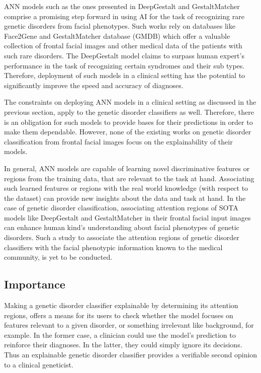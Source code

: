 \documentclass[../report.tex]{subfiles}
\begin{document}
    ANN models such as the ones presented in DeepGestalt \cite{Gurovich2019} and GestaltMatcher \cite{hsieh2022gestaltmatcher} comprise a promising step forward in using AI for the task of recognizing rare genetic disorders from facial phenotypes. Such works rely on databases like Face2Gene \cite{face2gene} and GestaltMatcher database (GMDB) \cite{gmdb}  which offer a valuable collection of frontal facial images and other medical data of the patients with such rare disorders. The DeepGestalt \cite{Gurovich2019} model claims to surpass human expert's performance in the task of recognizing certain syndromes and their sub types. Therefore, deployment of such models in a clinical setting has the potential to significantly improve the speed and accuracy of diagnoses.
    
    The constraints on deploying ANN models in a clinical setting as discussed in the previous section, apply to the genetic disorder classifiers as well. Therefore, there is an obligation for such models to provide bases for their predictions in order to make them dependable. However, none of the existing works on genetic disorder classification from frontal facial images focus on the explainability of their models.
    
    In general, ANN models are capable of learning novel discriminative features or regions from the training data, that are relevant to the task at hand. Associating such learned features or regions with the real world knowledge (with respect to the dataset) can provide new insights about the data and task at hand. In the case of genetic disorder classification, associating attention regions of SOTA models like DeepGestalt \cite{Gurovich2019} and GestaltMatcher \cite{hsieh2022gestaltmatcher} in their frontal facial input images can enhance human kind's understanding about facial phenotypes of genetic disorders. Such a study to associate the attention regions of genetic disorder classifiers with the facial phenotypic information known to the medical community, is yet to be conducted.
    
    \subsection{Importance} \label{sec_importance}
    Making a genetic disorder classifier explainable by determining its attention regions, offers a means for its users to check whether the model focuses on features relevant to a given disorder, or something irrelevant like background, for example. In the former case, a clinician could use the model's prediction to reinforce their diagnoses. In the latter, they could simply ignore its decisions. Thus an explainable genetic disorder classifier provides a verifiable second opinion to a clinical geneticist.
    
\end{document}
